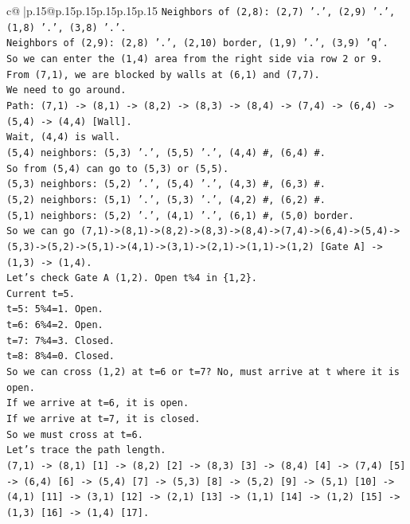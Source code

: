 \documentclass{article}
\begin{document}
{\begin{supertabular}{c@{$\;$}|p{.15\linewidth}@{}p{.15\linewidth}p{.15\linewidth}p{.15\linewidth}p{.15\linewidth}p{.15\linewidth}}
{{{\texttt{Neighbors of (2,8): (2,7) '.', (2,9) '.', (1,8) '.', (3,8) '.'.} \\
\texttt{Neighbors of (2,9): (2,8) '.', (2,10) border, (1,9) '.', (3,9) 'q'.} \\
\texttt{So we can enter the (1,4) area from the right side via row 2 or 9.} \\
\texttt{From (7,1), we are blocked by walls at (6,1) and (7,7).} \\
\texttt{We need to go around.} \\
\texttt{Path: (7,1) {-}> (8,1) {-}> (8,2) {-}> (8,3) {-}> (8,4) {-}> (7,4) {-}> (6,4) {-}> (5,4) {-}> (4,4) {[}Wall{]}.} \\
\texttt{Wait, (4,4) is wall.} \\
\texttt{(5,4) neighbors: (5,3) '.', (5,5) '.', (4,4) \#, (6,4) \#.} \\
\texttt{So from (5,4) can go to (5,3) or (5,5).} \\
\texttt{(5,3) neighbors: (5,2) '.', (5,4) '.', (4,3) \#, (6,3) \#.} \\
\texttt{(5,2) neighbors: (5,1) '.', (5,3) '.', (4,2) \#, (6,2) \#.} \\
\texttt{(5,1) neighbors: (5,2) '.', (4,1) '.', (6,1) \#, (5,0) border.} \\
\texttt{So we can go (7,1){-}>(8,1){-}>(8,2){-}>(8,3){-}>(8,4){-}>(7,4){-}>(6,4){-}>(5,4){-}>(5,3){-}>(5,2){-}>(5,1){-}>(4,1){-}>(3,1){-}>(2,1){-}>(1,1){-}>(1,2) {[}Gate A{]} {-}> (1,3) {-}> (1,4).} \\
\texttt{Let's check Gate A (1,2). Open t\%4 in \{1,2\}.} \\
\texttt{Current t=5.} \\
\texttt{t=5: 5\%4=1. Open.} \\
\texttt{t=6: 6\%4=2. Open.} \\
\texttt{t=7: 7\%4=3. Closed.} \\
\texttt{t=8: 8\%4=0. Closed.} \\
\texttt{So we can cross (1,2) at t=6 or t=7? No, must arrive at t where it is open.} \\
\texttt{If we arrive at t=6, it is open.} \\
\texttt{If we arrive at t=7, it is closed.} \\
\texttt{So we must cross at t=6.} \\
\texttt{Let's trace the path length.} \\
\texttt{(7,1) {-}> (8,1) {[}1{]} {-}> (8,2) {[}2{]} {-}> (8,3) {[}3{]} {-}> (8,4) {[}4{]} {-}> (7,4) {[}5{]} {-}> (6,4) {[}6{]} {-}> (5,4) {[}7{]} {-}> (5,3) {[}8{]} {-}> (5,2) {[}9{]} {-}> (5,1) {[}10{]} {-}> (4,1) {[}11{]} {-}> (3,1) {[}12{]} {-}> (2,1) {[}13{]} {-}> (1,1) {[}14{]} {-}> (1,2) {[}15{]} {-}> (1,3) {[}16{]} {-}> (1,4) {[}17{]}.} \\
}}}
\end{supertabular}}
\end{document}
